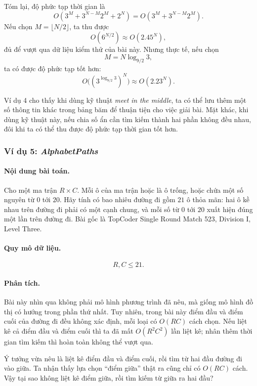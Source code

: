 \documentclass[11pt]{article}
\begin{document}
Tóm lại, độ phức tạp thời gian là
\[
  O(3^M+3^{N-M}2^M+2^N)=O(3^M+3^{N-M}2^M).
\]
Nếu chọn \(M=\lfloor N/2\rfloor\), ta thu được
\[
  O(6^{N/2})\approx O(2.45^N),
\]
đủ để vượt qua dữ liệu kiểm thử của bài này. Nhưng thực tế, nếu chọn
\[
  M=N\log_{9/2}3,
\]
ta có được độ phức tạp tốt hơn:
\[
  O\bigl((3^{\log_{9/2}3})^N\bigr)\approx O(2.23^N).
\]

Ví dụ 4 cho thấy khi dùng kỹ thuật \emph{meet in the middle}, ta có thể lưu
thêm một số thông tin khác trong bảng băm để thuận tiện cho việc giải bài.
Mặt khác, khi dùng kỹ thuật này, nếu chia số ẩn cần tìm kiếm thành hai phần
không đều nhau, đôi khi ta có thể thu được độ phức tạp thời gian tốt hơn.

\subsubsection{Ví dụ 5: \emph{AlphabetPaths}}

\paragraph{Nội dung bài toán.}
Cho một ma trận \(R\times C\). Mỗi ô của ma trận hoặc là ô trống, hoặc chứa
một số nguyên từ \(0\) tới \(20\). Hãy tính có bao nhiêu đường đi gồm \(21\)
ô thỏa mãn: hai ô kề nhau trên đường đi phải có một cạnh chung, và mỗi số từ
\(0\) tới \(20\) xuất hiện đúng một lần trên đường đi. Bài gốc là TopCoder
Single Round Match 523, Division I, Level Three.

\paragraph{Quy mô dữ liệu.}
\[
  R,C\le 21.
\]

\paragraph{Phân tích.}
Bài này nhìn qua không phải mô hình phương trình đã nêu, mà giống mô hình đồ
thị có hướng trong phần thứ nhất. Tuy nhiên, trong bài này điểm đầu và điểm
cuối của đường đi đều không xác định, mỗi loại có \(O(RC)\) cách chọn. Nếu
liệt kê cả điểm đầu và điểm cuối thì ta đã mất \(O(R^2C^2)\) lần liệt kê;
nhân thêm thời gian tìm kiếm thì hoàn toàn không thể vượt qua.

Ý tưởng vừa nêu là liệt kê điểm đầu và điểm cuối, rồi tìm từ hai đầu đường đi
vào giữa. Ta nhận thấy lựa chọn ``điểm giữa'' thật ra cũng chỉ có \(O(RC)\)
cách. Vậy tại sao không liệt kê điểm giữa, rồi tìm kiếm từ giữa ra hai đầu?
\end{document}
